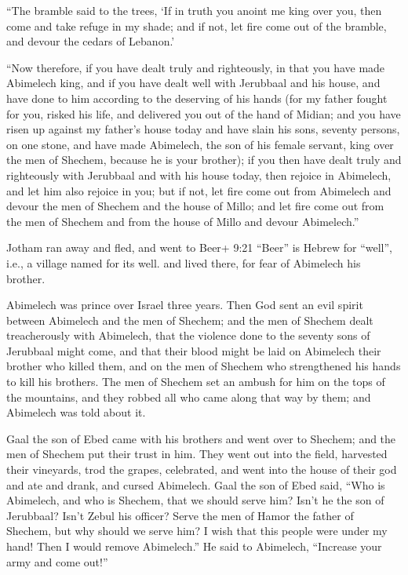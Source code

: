  ``The bramble said to the trees, `If in truth you anoint
me king over you, then come and take refuge in my shade; and if not, let
fire come out of the bramble, and devour the cedars of Lebanon.'

 ``Now therefore, if you have dealt truly and righteously,
in that you have made Abimelech king, and if you have dealt well with
Jerubbaal and his house, and have done to him according to the deserving
of his hands  (for my father fought for you, risked his
life, and delivered you out of the hand of Midian;  and you
have risen up against my father's house today and have slain his sons,
seventy persons, on one stone, and have made Abimelech, the son of his
female servant, king over the men of Shechem, because he is your
brother);  if you then have dealt truly and righteously
with Jerubbaal and with his house today, then rejoice in Abimelech, and
let him also rejoice in you;  but if not, let fire come out
from Abimelech and devour the men of Shechem and the house of Millo; and
let fire come out from the men of Shechem and from the house of Millo
and devour Abimelech.''

 Jotham ran away and fled, and went to Beer+ 9:21 ``Beer''
is Hebrew for ``well'', i.e., a village named for its well. and lived
there, for fear of Abimelech his brother.

 Abimelech was prince over Israel three years.
 Then God sent an evil spirit between Abimelech and the men
of Shechem; and the men of Shechem dealt treacherously with Abimelech,
 that the violence done to the seventy sons of Jerubbaal
might come, and that their blood might be laid on Abimelech their
brother who killed them, and on the men of Shechem who strengthened his
hands to kill his brothers.  The men of Shechem set an
ambush for him on the tops of the mountains, and they robbed all who
came along that way by them; and Abimelech was told about it.

 Gaal the son of Ebed came with his brothers and went over
to Shechem; and the men of Shechem put their trust in him. 
They went out into the field, harvested their vineyards, trod the
grapes, celebrated, and went into the house of their god and ate and
drank, and cursed Abimelech.  Gaal the son of Ebed said,
``Who is Abimelech, and who is Shechem, that we should serve him? Isn't
he the son of Jerubbaal? Isn't Zebul his officer? Serve the men of Hamor
the father of Shechem, but why should we serve him?  I wish
that this people were under my hand! Then I would remove Abimelech.'' He
said to Abimelech, ``Increase your army and come out!''


